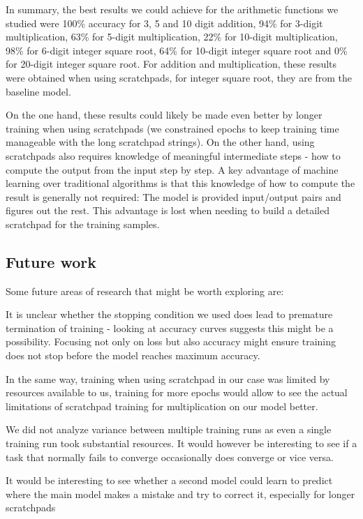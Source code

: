 In summary, the best results we could achieve for the arithmetic functions we studied were 100\% accuracy for 3, 5 and 10 digit addition, 94\% for 3-digit multiplication, 63\% for 5-digit multiplication, 22\% for 10-digit multiplication, 98\% for 6-digit integer square root, 64\% for 10-digit integer square root and 0\% for 20-digit integer square root.
For addition and multiplication, these results were obtained when using scratchpads, for integer square root, they are from the baseline model.

On the one hand, these results could likely be made even better by longer training when using scratchpads (we constrained epochs to keep training time manageable with the long scratchpad strings).
On the other hand, using scratchpads also requires knowledge of meaningful intermediate steps - how to compute the output from the input step by step. A key advantage of machine learning over traditional algorithms is that this knowledge of how to compute the result is generally not required: The model is provided input/output pairs and figures out the rest. This advantage is lost when needing to build a detailed scratchpad for the training samples.



\subsection{Future work}

Some future areas of research that might be worth exploring are:

It is unclear whether the stopping condition we used does lead to premature termination of training - looking at accuracy curves suggests this might be a possibility. Focusing not only on loss but also accuracy might ensure training does not stop before the model reaches maximum accuracy.

In the same way, training when using scratchpad in our case was limited by resources available to us, training for more epochs would allow to see the actual limitations of scratchpad training for multiplication on our model better.

We did not analyze variance between multiple training runs as even a single training run took substantial resources. It would however be interesting to see if a task that normally fails to converge occasionally does converge or vice versa.

It would be interesting to see whether a second model could learn to predict where the main model makes a mistake and try to correct it, especially for longer scratchpads

